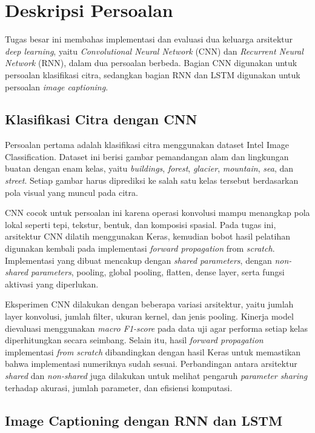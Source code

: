 \section{Deskripsi Persoalan}

Tugas besar ini membahas implementasi dan evaluasi dua keluarga arsitektur
\textit{deep learning}, yaitu \textit{Convolutional Neural Network} (CNN) dan
\textit{Recurrent Neural Network} (RNN), dalam dua persoalan berbeda. Bagian CNN
digunakan untuk persoalan klasifikasi citra, sedangkan bagian RNN dan LSTM
digunakan untuk persoalan \textit{image captioning}.
\subsection{Klasifikasi Citra dengan CNN}

Persoalan pertama adalah klasifikasi citra menggunakan dataset Intel Image
Classification. Dataset ini berisi gambar pemandangan alam dan lingkungan buatan
dengan enam kelas, yaitu \textit{buildings}, \textit{forest}, \textit{glacier},
\textit{mountain}, \textit{sea}, dan \textit{street}. Setiap gambar harus
diprediksi ke salah satu kelas tersebut berdasarkan pola visual yang muncul pada
citra.

CNN cocok untuk persoalan ini karena operasi konvolusi mampu menangkap pola
lokal seperti tepi, tekstur, bentuk, dan komposisi spasial. Pada tugas ini,
arsitektur CNN dilatih menggunakan Keras, kemudian bobot hasil pelatihan
digunakan kembali pada implementasi \textit{forward propagation} from \textit{scratch}.
Implementasi yang dibuat mencakup  dengan \textit{shared
parameters},  dengan \textit{non-shared parameters},
pooling, global pooling, flatten, dense layer, serta fungsi aktivasi yang
diperlukan.

Eksperimen CNN dilakukan dengan beberapa variasi arsitektur, yaitu jumlah layer
konvolusi, jumlah filter, ukuran kernel, dan jenis pooling. Kinerja model
dievaluasi menggunakan \textit{macro F1-score} pada data uji agar performa setiap
kelas diperhitungkan secara seimbang. Selain itu, hasil \textit{forward
propagation} implementasi \textit{from scratch} dibandingkan dengan hasil Keras
untuk memastikan bahwa implementasi numeriknya sudah sesuai. Perbandingan antara
arsitektur \textit{shared} dan \textit{non-shared} juga dilakukan untuk melihat
pengaruh \textit{parameter sharing} terhadap akurasi, jumlah parameter, dan
efisiensi komputasi.

\subsection{Image Captioning dengan RNN dan LSTM}

